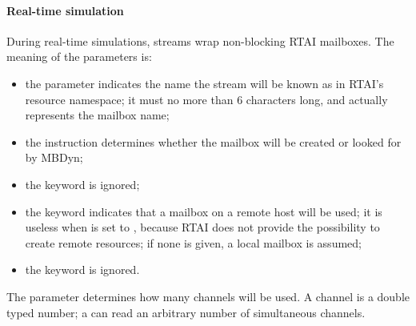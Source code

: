 \paragraph{Real-time simulation}
During real-time simulations, streams wrap non-blocking RTAI mailboxes.
The meaning of the parameters is:
\begin{itemize}
\item the parameter  indicates the name the stream
will be known as in RTAI's resource namespace;
it must no more than 6 characters long, and actually represents the mailbox name;
\item the instruction  determines whether the mailbox will be
created or looked for by MBDyn;
\item the keyword  is ignored;
\item the keyword  indicates that a mailbox on a remote host 
will be used; it is useless when  is set to , because
RTAI does not provide the possibility to create remote resources;
if none is given, a local mailbox is assumed;
\item the keyword  is ignored.
\end{itemize}

The parameter  determines how many
channels will be used.
A channel is a double typed number; a  can read
an arbitrary number of simultaneous channels.
